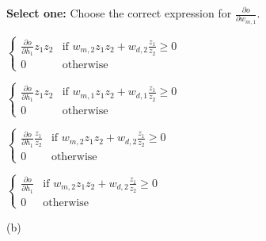 \begin{questions}
\question[4]\textbf{Select one:}
Choose the correct expression for $\frac{\partial o}{\partial w_{m,1}}$.
\begin{checkboxes}
     \choice $\begin{cases}
     \frac{\partial o}{\partial h_1}z_1z_2 &\text{if $w_{m,2} z_1 z_2 +w_{d,2} \frac{z_1}{z_2} \geq 0$}\\
     0 &\text{otherwise}
     \end{cases}$
     
     \choice $\begin{cases}
     \frac{\partial o}{\partial h_1}z_1z_2 &\text{if $w_{m,1} z_1 z_2 +w_{d,1} \frac{z_1}{z_2} \geq 0$}\\
     0 &\text{otherwise}
     \end{cases}$
     
     \choice $\begin{cases}
     \frac{\partial o}{\partial h_1}\frac{z_1}{z_2} &\text{if $w_{m,2} z_1 z_2 +w_{d,2} \frac{z_1}{z_2} \geq 0$}\\
     0 &\text{otherwise}
     \end{cases}$
     
     \choice $\begin{cases}
     \frac{\partial o}{\partial h_1} &\text{if $w_{m,2} z_1 z_2 +w_{d,2} \frac{z_1}{z_2} \geq 0$}\\
     0 &\text{otherwise}
     \end{cases}$
\end{checkboxes}

\begin{soln}
(b)
\end{soln}



\end{questions}